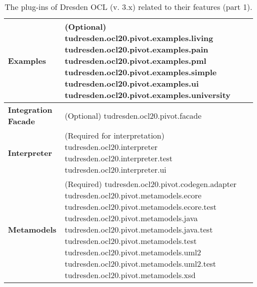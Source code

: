 \begin{table}[p]
\begin{tabular}{|p{4cm}|p{10cm}|}
    \textbf{Examples} &
    (Optional)\newline
    tudresden.ocl20.pivot.examples.living\newline
    tudresden.ocl20.pivot.examples.pain\newline
    tudresden.ocl20.pivot.examples.pml\newline
    tudresden.ocl20.pivot.examples.simple\newline
    tudresden.ocl20.pivot.examples.ui\newline
    tudresden.ocl20.pivot.examples.university\\
    \hline

    \textbf{Integration Facade} &
    (Optional)\newline
    tudresden.ocl20.pivot.facade\\
    \hline

    \textbf{Interpreter} &
    (Required for interpretation)\newline
    tudresden.ocl20.interpreter\newline
    tudresden.ocl20.interpreter.test\newline
    tudresden.ocl20.interpreter.ui\\
    \hline
 
    \textbf{Metamodels} &
    (Required)\newline
    tudresden.ocl20.pivot.codegen.adapter\newline
    tudresden.ocl20.pivot.metamodels.ecore\newline
    tudresden.ocl20.pivot.metamodels.ecore.test\newline
    tudresden.ocl20.pivot.metamodels.java\newline
    tudresden.ocl20.pivot.metamodels.java.test\newline
    tudresden.ocl20.pivot.metamodels.test\newline
    tudresden.ocl20.pivot.metamodels.uml2\newline
    tudresden.ocl20.pivot.metamodels.uml2.test\newline
    tudresden.ocl20.pivot.metamodels.xsd\\
    \hline
 
\end{tabular}
\caption{The plug-ins of Dresden OCL (v. 3.x) related to their features (part 1).}
\label{tab:plugins}
\end{table}

